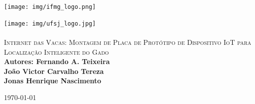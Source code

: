 \begin{titlepage}
\begin{center}

\texttt{[image: img/ifmg\_logo.png]}~\\[1cm]

{
\newline
}

\texttt{[image: img/ufsj\_logo.jpg]}~\\[1cm]

\textsc{\Large \\Internet das Vacas: Montagem de Placa de Protótipo de
Dispositivo IoT para Localização Inteligente do Gado}\\[3cm]


{\large \bfseries Autores: Fernando A. Teixeira \\
João Victor Carvalho Tereza \\
Jonas Henrique Nascimento \\}



\vfill

{\large \today}
\end{center}
\end{titlepage}